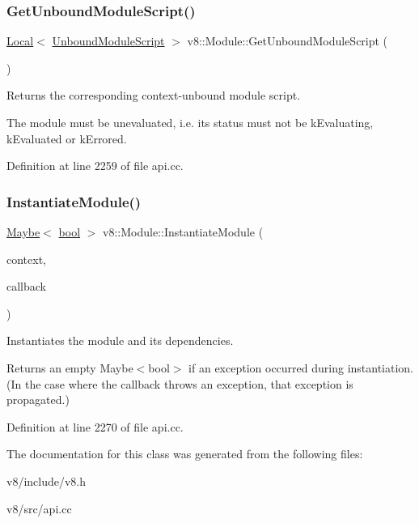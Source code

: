 \subsubsection{\texorpdfstring{Get\+Unbound\+Module\+Script()}{GetUnboundModuleScript()}}
{\footnotesize\ttfamily \mbox{\hyperlink{classv8_1_1Local}{Local}}$<$ \mbox{\hyperlink{classv8_1_1UnboundModuleScript}{Unbound\+Module\+Script}} $>$ v8\+::\+Module\+::\+Get\+Unbound\+Module\+Script (\begin{DoxyParamCaption}{ }\end{DoxyParamCaption})}

Returns the corresponding context-\/unbound module script.

The module must be unevaluated, i.\+e. its status must not be k\+Evaluating, k\+Evaluated or k\+Errored. 

Definition at line 2259 of file api.\+cc.

\mbox{\label{classv8_1_1Module_a1183f82748a802be435e02a53816b617}} 
\subsubsection{\texorpdfstring{Instantiate\+Module()}{InstantiateModule()}}
{\footnotesize\ttfamily \mbox{\hyperlink{classv8_1_1Maybe}{Maybe}}$<$ \mbox{\hyperlink{classbool}{bool}} $>$ v8\+::\+Module\+::\+Instantiate\+Module (\begin{DoxyParamCaption}\item[{\mbox{\hyperlink{classv8_1_1Local}{Local}}$<$ Context $>$}]{context,  }\item[{Module\+::\+Resolve\+Callback}]{callback }\end{DoxyParamCaption})}

Instantiates the module and its dependencies.

Returns an empty Maybe$<$bool$>$ if an exception occurred during instantiation. (In the case where the callback throws an exception, that exception is propagated.) 

Definition at line 2270 of file api.\+cc.



The documentation for this class was generated from the following files\+:\begin{DoxyCompactItemize}
\item 
v8/include/v8.\+h\item 
v8/src/api.\+cc\end{DoxyCompactItemize}
